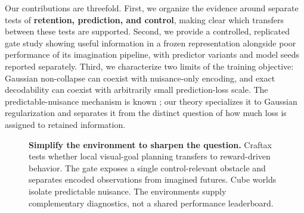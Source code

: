 Our contributions are threefold. First, we organize the evidence around separate tests of
\textbf{retention, prediction, and control}, making clear which transfers between these tests are
supported. Second, we provide a controlled, replicated gate study showing useful information in a
frozen representation alongside poor performance of its imagination pipeline, with predictor
variants and model seeds reported separately. Third, we characterize two limits of the training
objective: Gaussian non-collapse can coexist with nuisance-only encoding, and exact decodability
can coexist with arbitrarily small prediction-loss scale. The predictable-nuisance mechanism is
known \citep{sobal2022slow}; our theory specializes it to Gaussian regularization and separates it
from the distinct question of how much loss is assigned to retained information.

\begin{figure}[t]
\centering
{}
\caption{\textbf{Simplify the environment to sharpen the question.} Craftax tests whether local
visual-goal planning transfers to reward-driven behavior. The gate exposes a single control-relevant
obstacle and separates encoded observations from imagined futures. Cube worlds isolate predictable
nuisance. The environments supply complementary diagnostics, not a shared performance leaderboard.}
\label{fig:staircase}
\end{figure}
